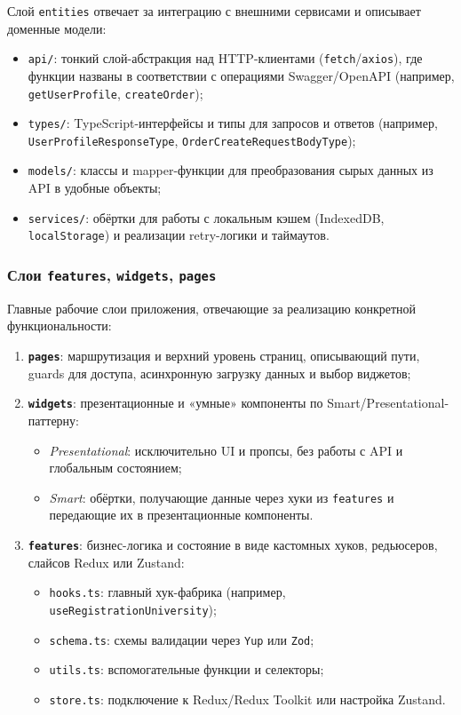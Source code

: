 Слой \texttt{entities} отвечает за интеграцию с внешними сервисами и описывает доменные модели:
\begin{itemize}
  \item \texttt{api/}: тонкий слой-абстракция над HTTP-клиентами (\texttt{fetch}/\texttt{axios}), где функции названы в соответствии с операциями Swagger/OpenAPI (например, \texttt{getUserProfile}, \texttt{createOrder});
  \item \texttt{types/}: TypeScript-интерфейсы и типы для запросов и ответов (например, \texttt{UserProfileResponseType}, \texttt{OrderCreateRequestBodyType});
  \item \texttt{models/}: классы и mapper-функции для преобразования сырых данных из API в удобные объекты;
  \item \texttt{services/}: обёртки для работы с локальным кэшем (IndexedDB, \texttt{localStorage}) и реализации retry-логики и таймаутов.
\end{itemize}

\subsubsection{Слои \texttt{features}, \texttt{widgets}, \texttt{pages}}

Главные рабочие слои приложения, отвечающие за реализацию конкретной функциональности:
\begin{enumerate}
  \item \textbf{\texttt{pages}}: маршрутизация и верхний уровень страниц, описывающий пути, guards для доступа, асинхронную загрузку данных и выбор виджетов;
  \item \textbf{\texttt{widgets}}: презентационные и «умные» компоненты по Smart/Presentational-паттерну:
    \begin{itemize}
      \item \emph{Presentational}: исключительно UI и пропсы, без работы с API и глобальным состоянием;
      \item \emph{Smart}: обёртки, получающие данные через хуки из \texttt{features} и передающие их в презентационные компоненты.
    \end{itemize}
  \item \textbf{\texttt{features}}: бизнес-логика и состояние в виде кастомных хуков, редьюсеров, слайсов Redux или Zustand:
    \begin{itemize}
      \item \texttt{hooks.ts}: главный хук-фабрика (например, \texttt{useRegistrationUniversity});
      \item \texttt{schema.ts}: схемы валидации через \texttt{Yup} или \texttt{Zod};
      \item \texttt{utils.ts}: вспомогательные функции и селекторы;
      \item \texttt{store.ts}: подключение к Redux/Redux Toolkit или настройка Zustand.
    \end{itemize}
\end{enumerate}

